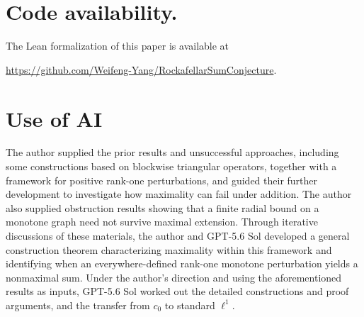 \documentclass[11pt]{article}
\theoremstyle{definition}
\theoremstyle{remark}
\begin{document}
\section*{Code availability.}
The Lean formalization of this paper is available at
\par\noindent\url{https://github.com/Weifeng-Yang/RockafellarSumConjecture}.


\section*{Use of AI}
The author supplied the prior results and unsuccessful approaches, including some constructions based on blockwise triangular operators, together with a framework for positive rank-one perturbations, and guided their further development to investigate how maximality can fail under addition. The author also supplied obstruction results showing that a finite radial bound on a monotone graph need not survive maximal extension. Through iterative discussions of these materials, the author and GPT-5.6 Sol developed a general construction theorem characterizing maximality within this framework and identifying when an everywhere-defined rank-one monotone perturbation yields a nonmaximal sum.  Under the author's direction and using the aforementioned results as inputs, GPT-5.6 Sol worked out the detailed constructions and proof arguments, and the transfer from $c_0$ to standard $\ell^1$. 





\appendix
{}
\end{document}
